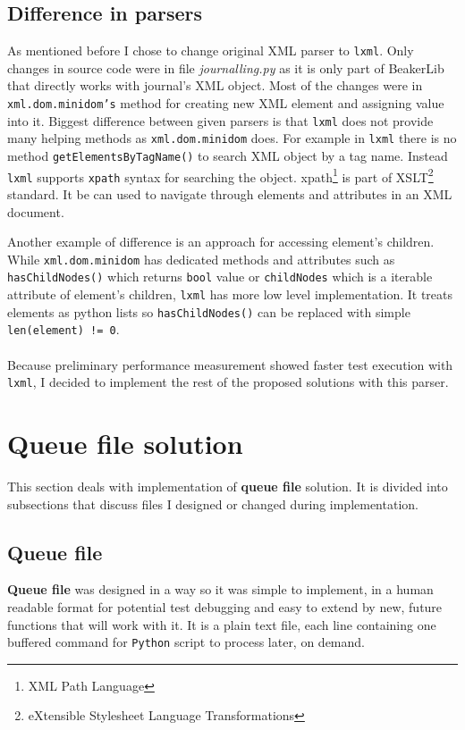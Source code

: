 \subsection{Difference in parsers}
As mentioned before I chose to change original XML parser to \texttt{lxml}. Only changes in source code were in file \textit{journalling.py} as it is only part of BeakerLib that directly works with journal's XML object. 
Most of the changes were in \texttt{xml.dom.minidom's} method for creating new XML element and assigning value into it.
Biggest difference between given parsers is that \texttt{lxml} does not provide many helping methods as \texttt{xml.dom.minidom} does.
For example in \texttt{lxml}  there is no method \texttt{getElementsByTagName()} to search XML object by a tag name. Instead \texttt{lxml} supports \texttt{xpath} \cite{xpath} syntax for searching the object. xpath\footnote{XML Path Language} is part of XSLT\footnote{eXtensible Stylesheet Language Transformations} standard. It be can used to navigate through elements and attributes in an XML document.

Another example of difference is an approach for accessing element's children. While \texttt{xml.dom.minidom} has dedicated methods and attributes such as \texttt{hasChildNodes()} which returns \texttt{bool} value or \texttt{childNodes} which is a iterable attribute of element's children, \texttt{lxml} has more low level implementation. It treats elements as python lists so \texttt{hasChildNodes()} can be replaced with simple \texttt{len(element) != 0}.
\\
\\
Because preliminary performance measurement showed faster test execution with \texttt{lxml}, I decided to implement the rest of the proposed solutions with this parser.

\section{Queue file solution}
This section deals with implementation of \textbf{queue file} solution. It is divided into subsections that discuss files I designed or changed during implementation. 

\subsection{Queue file}
\textbf{Queue file} was designed in a way so it was simple to implement, in a human readable format for potential test debugging and easy to extend by new, future functions that will work with it. 
It is a plain text file, each line containing one buffered command for \texttt{Python} script to process later, on demand. 

